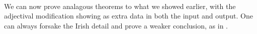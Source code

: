 \begin{code}[hide]
\AgdaSymbol{(}\AgdaSpace{}%
\AgdaSpace{}%
\AgdaSpace{}%
\AgdaOperator{\AgdaInductiveConstructor{,}}\AgdaSpace{}%
\AgdaSymbol{)}\AgdaSpace{}%
\AgdaSymbol{=}\AgdaSpace{}%
\AgdaSymbol{(}\AgdaSpace{}%
\AgdaSymbol{(}\AgdaSpace{}%
\AgdaSymbol{)}\AgdaSpace{}%
\AgdaSymbol{)}\AgdaSpace{}%
\AgdaOperator{\AgdaInductiveConstructor{,}}\AgdaSpace{}%
\<%
\\
%
\\[\AgdaEmptyExtraSkip]%
\>[0]\AgdaSpace{}%
\AgdaSymbol{:}\AgdaSpace{}%
\AgdaSymbol{\{}\AgdaSpace{}%
\AgdaSymbol{:}\AgdaSpace{}%
\AgdaSymbol{\}}\AgdaSpace{}%
\AgdaSpace{}%
\AgdaSpace{}%
\AgdaSpace{}%
\<%
\\
\>[0]\AgdaSpace{}%
\AgdaSpace{}%
\AgdaSymbol{=}\AgdaSpace{}%
\<%
\end{code}

We can now prove analagous theorems to what we showed earlier, with the
adjectival modification showing as extra data in both the input and output. One
can always forsake the Irish detail and prove a weaker conclusion, as in
.

